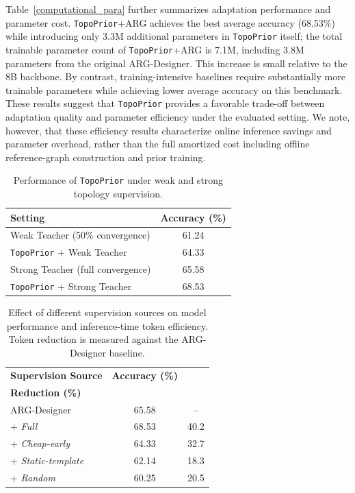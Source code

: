 \documentclass[lettersize,journal]{IEEEtran}
\theoremstyle{plain}
\begin{document}
Table~\ref{computational_para} further summarizes adaptation performance and parameter cost. \texttt{TopoPrior}+ARG achieves the best average accuracy (68.53\%) while introducing only 3.3M additional parameters in \texttt{TopoPrior} itself; the total trainable parameter count of \texttt{TopoPrior}+ARG is 7.1M, including 3.8M parameters from the original ARG-Designer. This increase is small relative to the 8B backbone. By contrast, training-intensive baselines require substantially more trainable parameters while achieving lower average accuracy on this benchmark. These results suggest that \texttt{TopoPrior} provides a favorable trade-off between adaptation quality and parameter efficiency under the evaluated setting. We note, however, that these efficiency results characterize online inference savings and parameter overhead, rather than the full amortized cost including offline reference-graph construction and prior training.


\begin{table}[!t]
\centering
\caption{Performance of \texttt{TopoPrior} under weak and strong topology supervision.}
\label{tab_weak_teacher}
\begin{tabular}{lc}
\toprule
\textbf{Setting} & \textbf{Accuracy (\%)} \\
\midrule
Weak Teacher (50\% convergence) & 61.24 \\
\texttt{TopoPrior} + Weak Teacher & 64.33 \\
Strong Teacher (full convergence) & 65.58 \\
\texttt{TopoPrior} + Strong Teacher & 68.53 \\
\bottomrule
\end{tabular}
\vspace{-1em}
\end{table}

\begin{table}[!t]
\centering
\caption{Effect of different supervision sources on model performance and inference-time token efficiency. Token reduction is measured against the ARG-Designer baseline.}
\label{tab_supervision_alternatives}
\begin{tabular}{lcc}
\toprule
\textbf{Supervision Source} & \textbf{Accuracy (\%)} & \makecell[c]{\textbf{Token} \\ \textbf{Reduction (\%)}} \\
\midrule
ARG-Designer & 65.58 & -- \\
+ \textit{Full} & 68.53 & 40.2 \\
+ \textit{Cheap-early} & 64.33 & 32.7 \\
+ \textit{Static-template} & 62.14 & 18.3 \\
+ \textit{Random} & 60.25 & 20.5 \\
\bottomrule
\end{tabular}
\vspace{-1em}
\end{table}
\end{document}
